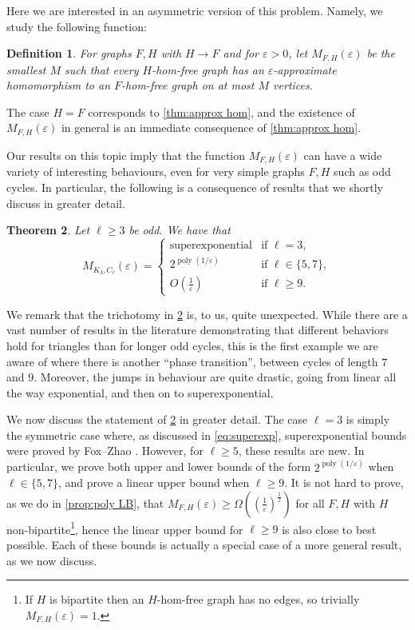 \documentclass[reqno, english, 12pt]{amsart}
\theoremstyle{plain}
\newtheorem{theorem}{Theorem}[section]
\newtheorem{definition}[theorem]{Definition}
\theoremstyle{remark}
\DeclareMathOperator{\poly}{poly}
\renewcommand{\geq}{\geqslant}
\begin{document}
Here we are interested in an asymmetric version of this problem. Namely, we study the following function:
\begin{definition}
    For graphs $F,H$ with $H \rightarrow F$ and for $\varepsilon > 0$, let $M_{F,H}(\varepsilon)$ be the smallest $M$ such that every $H$-hom-free graph has an $\varepsilon$-approximate homomorphism to an $F$-hom-free graph on at most $M$ vertices.
\end{definition}

The case $H=F$ corresponds to \cref{thm:approx hom}, and the existence of $M_{F,H}(\varepsilon)$ in general is an immediate consequence of \cref{thm:approx hom}.

Our results on this topic imply that the function $M_{F,H}(\varepsilon)$ can have a wide variety of interesting behaviours, even for very simple graphs $F,H$ such as odd cycles. In particular, the following is a consequence of results that we shortly discuss in greater detail.
\begin{theorem}\label{thm:odd cycles}
	Let $\ell \geq 3$ be odd. We have that
	\[
		M_{K_3, C_\ell}(\varepsilon) = 
		\begin{cases}
			\text{superexponential} & \text{if }\ell=3,\\
			2^{\poly(1/\varepsilon)} & \text{if } \ell \in \{5,7\},\\
			O(\frac 1\varepsilon) & \text{if }\ell \geq 9.
		\end{cases}
	\]
\end{theorem}
We remark that the trichotomy in \cref{thm:odd cycles} is, to us, quite unexpected. While there are a vast number of results in the literature demonstrating that different behaviors hold for triangles than for longer odd cycles, this is the first example we are aware of where there is another ``phase transition'', between cycles of length $7$ and $9$. 
Moreover, the jumps in behaviour are quite drastic, going from linear all the way exponential, and then on to superexponential.

We now discuss the statement of \cref{thm:odd cycles} in greater detail.
The case $\ell=3$ is simply the symmetric case where, as discussed in \eqref{eq:superexp}, superexponential bounds were proved by Fox--Zhao \cite{FZ}. However, for $\ell \geq 5$, these results are new. In particular, we prove both upper and lower bounds of the form $2^{\poly(1/\varepsilon)}$ when $\ell \in \{5,7\}$, and prove a linear upper bound when $\ell \geq 9$. It is not hard to prove, as we do in \cref{prop:poly LB}, that $M_{F,H}(\varepsilon)\geq \Omega((\frac 1\varepsilon)^{\frac 12})$ for all $F,H$ with $H$ non-bipartite\footnote{If $H$ is bipartite then an $H$-hom-free graph has no edges, so trivially $M_{F,H}(\varepsilon) = 1$.}, hence the linear upper bound for $\ell \geq 9$ is also close to best possible. Each of these bounds is actually a special case of a more general result, as we now discuss.
\end{document}
